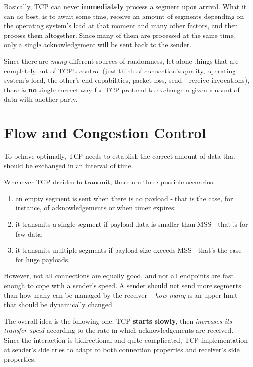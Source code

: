 \documentclass[10pt]{extbook}
\begin{document}
Basically, TCP can never \textbf{immediately} process a segment upon arrival.
What it can do best, is to await some time, receive an amount of segments
depending on the operating system's load at that moment and many other factors,
and then process them altogether. Since many of them are processed at the same
time, only a single acknowledgement will be sent back to the sender.

Since there are \emph{many} different sources of randomness, let alone things
that are completely out of TCP's control (just think of connection's quality,
operating system's load, the other's end capabilities, packet loss,
send\----receive invocations), there is \textbf{no} single correct way for TCP
protocol to exchange a given amount of data with another party.

\section{Flow and Congestion Control}

To behave optimally, TCP needs to establish the correct amount of data that
should be exchanged in an interval of time.

Whenever TCP decides to transmit, there are three possible scenarios: 
\begin{enumerate}
    \item an empty segment is sent when there is no payload \-- that is the
        case, for instance, of acknowledgements or when timer expires;
    \item it transmits a single segment if payload data is smaller than MSS \--
        that is for few data;
    \item it transmits multiple segments if payload size exceeds MSS \-- that's
        the case for huge payloads.
\end{enumerate}

However, not all connections are equally good, and not all endpoints are fast
enough to cope with a sender's speed. A sender should not send more segments
than how many can be managed by the receiver \--- \emph{how many} is an upper
limit that should be dynamically changed.

The overall idea is the following one: TCP \textbf{starts slowly}, then
\emph{increases its transfer speed} according to the rate in which
acknowledgements are received. Since the interaction is bidirectional and
quite complicated, TCP implementation at sender's side tries to adapt to
both connection properties and receiver's side properties. 
\end{document}

